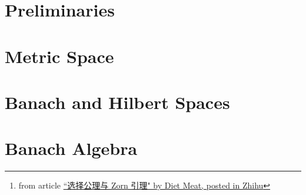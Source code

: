 \documentclass[10pt, a4paper]{article}
\begin{document}
\begin{abstract}
However, most of the Statistics undergraduate in BNU-HKBU United International College did not take the course of real analysis, only basic Multivariate Calculus, thus, there are multiple preliminary's knowledge missing. In this note, I am trying to fill the gap by covering the missing chapters and I highly recommend those students who enrol this course spend some time on Mathematical Analysis and Real Analysis, also, take some time to do the revision on Linear Algebra.

As a guide, the notes and exercises have been marked as follows:

\begin{enumerate}
    \item[$\blacktriangleright$] refers to important notes and results, also , \uline{underline} or \hl{hightlight}.
    \item[$*$] more advanced or difficult exercises that can be skipped on a first reading;
    \item[$\diamondsuit$] side remarks that can be skipped without losing any essential ideas
\end{enumerate}

\noindent``数学当中最麻烦的事情就是显然，我觉得显然，你觉得不显然这就是最麻烦的事情了” - ``Trivial is the biggest problem in mathematics". \footnote{from article \href{https://zhuanlan.zhihu.com/p/38029151}{``选择公理与 Zorn 引理" by Diet Meat, posted in Zhihu}}

\end{abstract}

\newpage 

\begin{multicols}{2}
\tableofcontents 
\listoftheorems[ignoreall,show=definition]
\end{multicols}

\newpage

\part{Preliminaries}



\part{Metric Space}



\part{Banach and Hilbert Spaces}


\part{Banach Algebra}


\newpage




\end{document}
